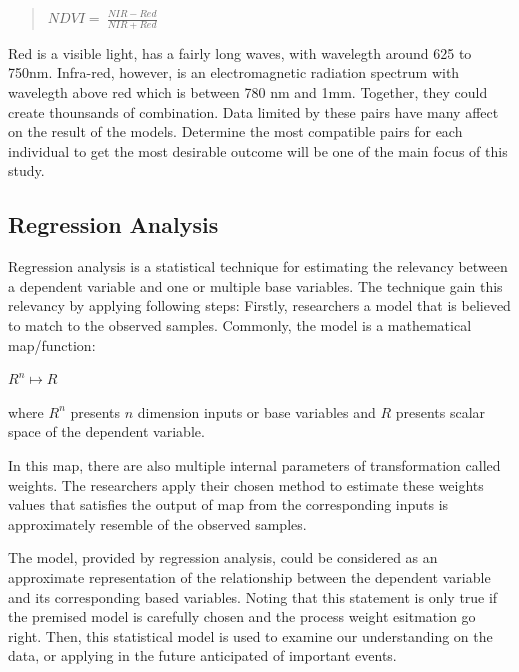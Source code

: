 \begin{quote}
    \(NDVI = \ \frac{NIR - Red}{NIR + Red}\ \)
\end{quote}

Red is a visible light, has a fairly long waves, with wavelegth around 625 to 750nm. Infra-red, however, is an electromagnetic radiation spectrum with wavelegth above red which is between 780 nm and 1mm. Together, they could create thounsands of combination. Data limited by these pairs have many affect on the result of the models. Determine the most compatible pairs for each individual to get the most desirable outcome will be one of the main focus of this study. 


\subsection{Regression Analysis}

Regression analysis is a statistical technique for estimating
the relevancy between a dependent variable and one or multiple base variables.
The technique gain this relevancy by applying following steps:
Firstly, researchers a model that is believed to match to the observed samples.
Commonly, the model is a mathematical map/function:

\begin{center}
    $R^{n} \mapsto R$
\end{center}

where $R^{n}$ presents $n$ dimension inputs or base variables
and $R$ presents scalar space of the dependent variable.

In this map, there are also multiple internal parameters of transformation called weights.
The researchers apply their chosen method to estimate these weights values
that satisfies the output of map from the corresponding inputs is approximately resemble of the observed samples.

The model, provided by regression analysis, could be considered as an approximate representation
of the relationship between the dependent variable and its corresponding based variables.
Noting that this statement is only true if the premised model is carefully chosen
and the process weight esitmation go right.
Then, this statistical model is used to examine our understanding on the data,
or applying in the future anticipated of important events.

